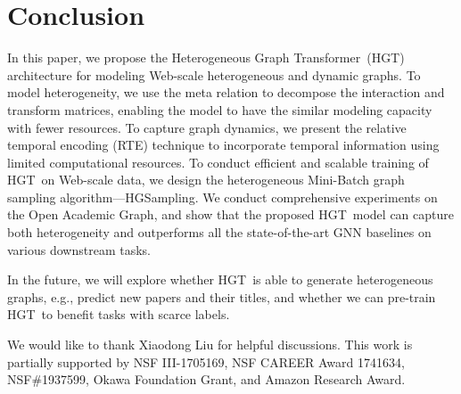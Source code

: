 \documentclass[sigconf]{acmart}
\theoremstyle{definition}
\newcommand{\model}{Heterogeneous Graph Transformer}
\newcommand{\short}{HGT}
\newcommand{\sampling}{HGSampling}
\begin{document}
\section{Conclusion}\label{sec:conclusion}



In this paper, we propose the \model\ (\short) architecture for modeling Web-scale heterogeneous and dynamic graphs. 
To model heterogeneity, we use the meta relation  to decompose the interaction and transform matrices, enabling the model to have the similar modeling capacity with fewer resources.
To capture graph dynamics, we present the relative temporal encoding  (RTE) technique to incorporate temporal information using limited computational resources. 
To conduct efficient and scalable training of \short\ on Web-scale data, we design the heterogeneous Mini-Batch graph sampling algorithm---\sampling. 
We conduct comprehensive experiments on the Open Academic Graph, and show that the proposed \short\ model can capture both heterogeneity and outperforms all the state-of-the-art GNN baselines on various downstream tasks.

In the future, we will explore whether \short\ is able to generate heterogeneous graphs, e.g., predict new papers and their titles, and whether we can pre-train \short\ to benefit tasks with scarce labels.


 We would like to thank Xiaodong Liu for helpful discussions. This work is partially supported by NSF III-1705169, NSF CAREER Award 1741634, NSF\#1937599, Okawa Foundation Grant, and Amazon Research Award. 

  
\balance

\end{document}
